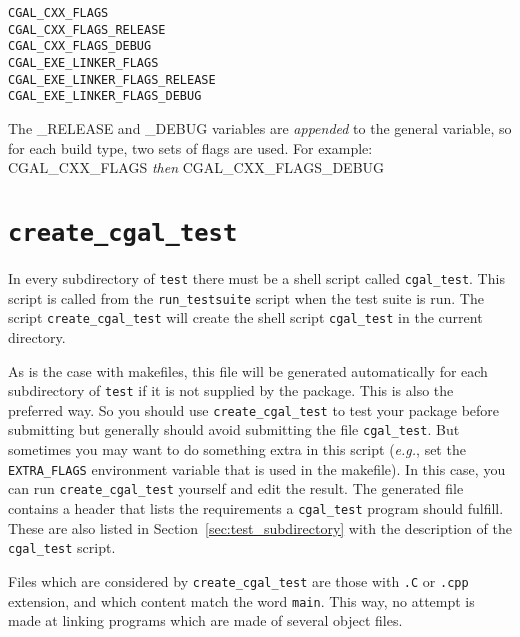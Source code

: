 \begin{verbatim}
CGAL_CXX_FLAGS
CGAL_CXX_FLAGS_RELEASE
CGAL_CXX_FLAGS_DEBUG
CGAL_EXE_LINKER_FLAGS
CGAL_EXE_LINKER_FLAGS_RELEASE
CGAL_EXE_LINKER_FLAGS_DEBUG
\end{verbatim}

The \_RELEASE and \_DEBUG variables are {\em appended} to the general variable, so for each
build type, two sets of flags are used. For example: CGAL\_CXX\_FLAGS {\em then} CGAL\_CXX\_FLAGS\_DEBUG 



\section{{\tt create\_cgal\_test}}
\label{sec:create_cgal_test}

In every subdirectory of {\tt test} there must be a shell script called
{\tt cgal\_test}. This script is called from the {\tt run\_testsuite}%
script when the test suite is run. The script
{{\tt create\_cgal\_test}}
will create the shell script {\tt cgal\_test} in the current directory.

As is the case with makefiles, this file will be generated automatically for
each subdirectory of {\tt test} if
it is not supplied by the package. This is also the preferred way.
So you should use {\tt create\_cgal\_test} to test your package before
submitting but generally should avoid submitting the file {\tt cgal\_test}.
But sometimes you may want to do something extra in this script ({\em e.g.}, set
the {\tt EXTRA\_FLAGS}
environment variable that is used in the makefile).
In this case, you can run {\tt create\_cgal\_test} yourself and edit the result.
The generated file contains a header that lists the requirements a
{\tt cgal\_test} program should fulfill. These are also listed in
Section~\ref{sec:test_subdirectory} with the description of the
{\tt cgal\_test} script.

Files which are considered by {{\tt create\_cgal\_test}} are those with
{\tt .C} or {\tt .cpp} extension, and which content match the word {\tt main}.
This way, no attempt is made at linking programs which are made of several
object files.

